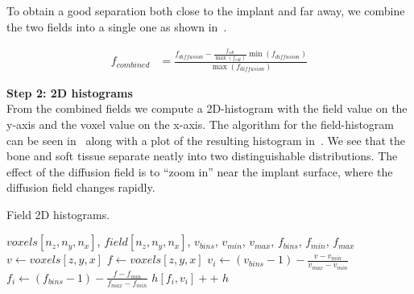 To obtain a good separation both close to the implant and far away, we combine the two fields into a
single one as shown in~.

%

\begin{equation}
    \label{eq:field-comb}
    \begin{split}
        f_{combined} &= \frac{f_{diffusion} - \frac{f_{edt}}{\max (f_{edt})} \min (f_{diffusion})}{\max (f_{diffusion})}
    \end{split}
\end{equation}

\vspace{\baselineskip}
\noindent\textbf{Step 2: 2D histograms} \\
From the combined fields we compute a 2D-histogram with the field value on the y-axis and the voxel
value on the x-axis.  The algorithm for the field-histogram can be seen in~
along with a plot of the resulting histogram in~. We see that the bone and soft tissue
separate neatly into two distinguishable distributions. The effect of the diffusion field is to ``zoom in'' near the implant surface,
where the diffusion field changes rapidly.


\begin{algorithm}
    \caption{Field 2D histograms.}
    \label{alg:field-hist}
    \begin{algorithmic}
         {$voxels[n_z,n_y,n_x]$, $field[n_z,n_y,n_x]$, $v_{bins}$, \indent \indent $v_{min}$, $v_{max}$, $f_{bins}$, $f_{min}$, $f_{max}$}
                \State $v \gets voxels[z,y,x]$
                    \State $f \gets voxels[z,y,x]$
                        \State $v_i \gets (v_{bins} - 1) - \frac{v - v_{min}}{v_{max} - v_{min}}$
                        \State $f_i \gets (f_{bins} - 1) - \frac{f - f_{min}}{f_{max} - f_{min}}$
                        \State $h[f_i,v_i]{+}{+}$
                    \EndIf
                \EndIf
            \EndFor
            \Return $h$
        \EndFunction
    \end{algorithmic}
\end{algorithm}


